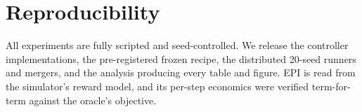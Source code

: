\documentclass[preprint,3p]{elsarticle}
\begin{document}
\section*{Reproducibility}
All experiments are fully scripted and seed-controlled. We release the controller
implementations, the pre-registered frozen recipe, the distributed 20-seed runners and mergers,
and the analysis producing every table and figure. EPI is read from the simulator's reward
model, and its per-step economics were verified term-for-term against the oracle's objective.



\end{document}

